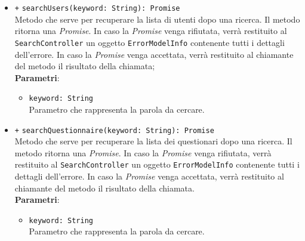 \begin{itemize}
\begin{itemize}
		\item \texttt{+} \texttt{searchUsers(keyword: String): Promise} \\Metodo che serve per recuperare la lista di utenti dopo una ricerca. Il metodo ritorna una \textit{Promise}. In caso la \textit{Promise} venga rifiutata, verrà restituito al \\ \texttt{SearchController} un oggetto \texttt{ErrorModelInfo} contenente tutti i dettagli dell'errore. In caso la \textit{Promise} venga accettata, verrà restituito al chiamante del metodo il risultato della chiamata;\\
		\textbf{Parametri}:
		\begin{itemize}
			\item \texttt{keyword: String} \\ Parametro che rappresenta la parola da cercare.
		\end{itemize}
		\item \texttt{+} \texttt{searchQuestionnaire(keyword: String): Promise} \\Metodo che serve per recuperare la lista dei questionari dopo una ricerca. Il metodo ritorna una \textit{Promise}. In caso la \textit{Promise} venga rifiutata, verrà restituito al \texttt{SearchController} un oggetto \texttt{ErrorModelInfo} contenente tutti i dettagli dell'errore. In caso la \textit{Promise} venga accettata, verrà restituito al chiamante del metodo il risultato della chiamata.\\
		\textbf{Parametri}:
		\begin{itemize}
			\item \texttt{keyword: String} \\ Parametro che rappresenta la parola da cercare.
		\end{itemize}
	\end{itemize}
\end{itemize}